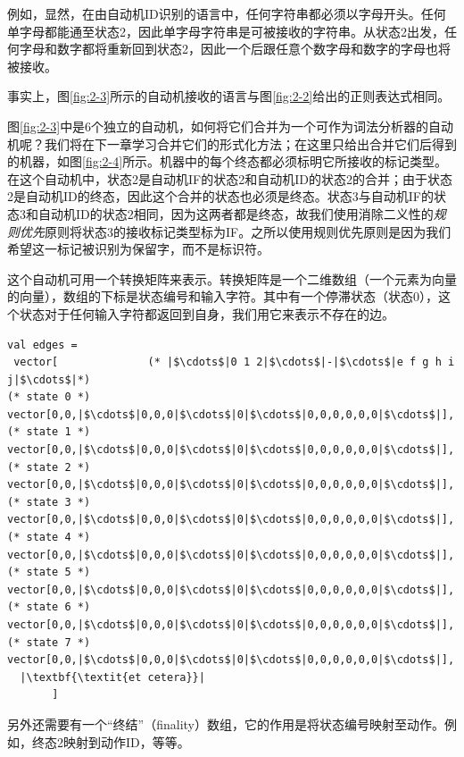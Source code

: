 \documentclass[cn,11pt,chinese]{elegantbook}
\begin{document}
例如，显然，在由自动机ID识别的语言中，任何字符串都必须以字母开头。任何单字母都能通至状态2，因此单字母字符串是可被接收的字符串。从状态2出发，任何字母和数字都将重新回到状态2，因此一个后跟任意个数字母和数字的字母也将被接收。

事实上，图\ref{fig:2-3}所示的自动机接收的语言与图\ref{fig:2-2}给出的正则表达式相同。

图\ref{fig:2-3}中是6个独立的自动机，如何将它们合并为一个可作为词法分析器的自动机呢？我们将在下一章学习合并它们的形式化方法；在这里只给出合并它们后得到的机器，如图\ref{fig:2-4}所示。机器中的每个终态都必须标明它所接收的标记类型。在这个自动机中，状态2是自动机IF的状态2和自动机ID的状态2的合并；由于状态2是自动机ID的终态，因此这个合并的状态也必须是终态。状态3与自动机IF的状态3和自动机ID的状态2相同，因为这两者都是终态，故我们使用消除二义性的\textit{规则优先}原则将状态3的接收标记类型标为IF。之所以使用规则优先原则是因为我们希望这一标记被识别为保留字，而不是标识符。

这个自动机可用一个转换矩阵来表示。转换矩阵是一个二维数组（一个元素为向量的向量），数组的下标是状态编号和输入字符。其中有一个停滞状态（状态0），这个状态对于任何输入字符都返回到自身，我们用它来表示不存在的边。

\clearpage
\begin{verbatim}
val edges =
 vector[              (* |$\cdots$|0 1 2|$\cdots$|-|$\cdots$|e f g h i j|$\cdots$|*)
(* state 0 *) vector[0,0,|$\cdots$|0,0,0|$\cdots$|0|$\cdots$|0,0,0,0,0,0|$\cdots$|],
(* state 1 *) vector[0,0,|$\cdots$|0,0,0|$\cdots$|0|$\cdots$|0,0,0,0,0,0|$\cdots$|],
(* state 2 *) vector[0,0,|$\cdots$|0,0,0|$\cdots$|0|$\cdots$|0,0,0,0,0,0|$\cdots$|],
(* state 3 *) vector[0,0,|$\cdots$|0,0,0|$\cdots$|0|$\cdots$|0,0,0,0,0,0|$\cdots$|],
(* state 4 *) vector[0,0,|$\cdots$|0,0,0|$\cdots$|0|$\cdots$|0,0,0,0,0,0|$\cdots$|],
(* state 5 *) vector[0,0,|$\cdots$|0,0,0|$\cdots$|0|$\cdots$|0,0,0,0,0,0|$\cdots$|],
(* state 6 *) vector[0,0,|$\cdots$|0,0,0|$\cdots$|0|$\cdots$|0,0,0,0,0,0|$\cdots$|],
(* state 7 *) vector[0,0,|$\cdots$|0,0,0|$\cdots$|0|$\cdots$|0,0,0,0,0,0|$\cdots$|],
  |\textbf{\textit{et cetera}}|
       ]   
\end{verbatim}

另外还需要有一个“终结”（finality）数组，它的作用是将状态编号映射至动作。例如，终态2映射到动作ID，等等。
\end{document}
